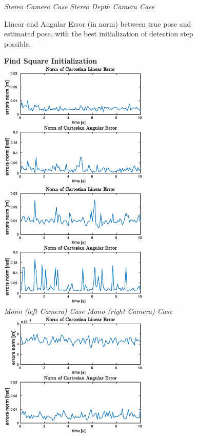 \begin{figure}
	\hspace*{20px}\textit{Stereo Camera Case} \hspace{75px} \textit{Stereo Depth Camera Case}\\
	\vspace{30px}
	\caption[Tracking error plots with ideal detection initialization]{Linear and Angular Error (in norm) between true pose and estimated pose, with the best initialization of detection step possible.}
	\label{fig:clickErrors}
\end{figure}

\begin{figure}
	\centering
	\textbf{Find Square Initialization}\\
	\vspace*{20px}
	\includegraphics[width=7.15cm]{tracking/square-mono-left.eps}
	\includegraphics[width=7.15cm]{tracking/square-mono-right.eps}\\
	\hspace*{15px}\textit{Mono (left Camera) Case} \hspace{55px} \textit{Mono (right Camera) Case}\\
	\vspace{30px}
	\includegraphics[width=7.15cm]{tracking/square-stereo.eps}

\end{figure}

